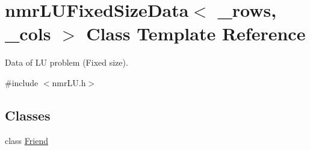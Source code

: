 \hypertarget{classnmr_l_u_fixed_size_data}{\section{nmr\-L\-U\-Fixed\-Size\-Data$<$ \-\_\-rows, \-\_\-cols $>$ Class Template Reference}
\label{classnmr_l_u_fixed_size_data}
}


Data of L\-U problem (Fixed size).  




{\ttfamily \#include $<$nmr\-L\-U.\-h$>$}

\subsection*{Classes}
\begin{DoxyCompactItemize}
\item 
class \hyperlink{classnmr_l_u_fixed_size_data_1_1_friend}{Friend}
\end{DoxyCompactItemize}
